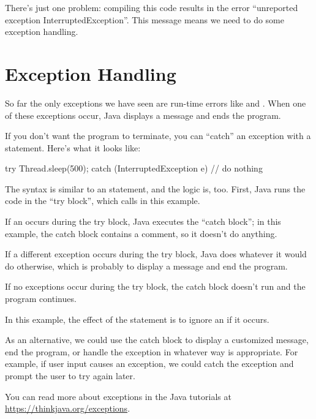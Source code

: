 
There's just one problem: compiling this code results in the error ``unreported exception InterruptedException''.
This message means we need to do some exception handling.


\section{Exception Handling}

So far the only exceptions we have seen are run-time errors like  and .
When one of these exceptions occur, Java displays a message and ends the program.

If you don't want the program to terminate, you can ``catch'' an exception with a  statement.
Here's what it looks like:


\begin{code}
try {
    Thread.sleep(500);
} catch (InterruptedException e) {
    // do nothing
}
\end{code}

The syntax is similar to an  statement, and the logic is, too.
First, Java runs the code in the ``try block'', which calls  in this example.

If an  occurs during the try block, Java executes the ``catch block''; in this example, the catch block contains a comment, so it doesn't do anything.

If a different exception occurs during the try block, Java does whatever it would do otherwise, which is probably to display a message and end the program.

If no exceptions occur during the try block, the catch block doesn't run and the program continues.

In this example, the effect of the  statement is to ignore an  if it occurs.

As an alternative, we could use the catch block to display a customized message, end the program, or handle the exception in whatever way is appropriate.
For example, if user input causes an exception, we could catch the exception and prompt the user to try again later.

You can read more about exceptions in the Java tutorials at \url{https://thinkjava.org/exceptions}.


